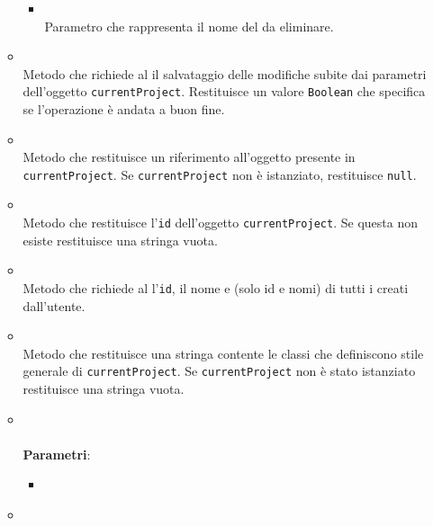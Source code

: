 \begin{itemize}
\begin{itemize}
\begin{itemize}
\item {}
\\ Parametro che rappresenta il nome del  da eliminare.
\end{itemize}
\item {}
\\ Metodo che richiede al  il salvataggio delle modifiche subite dai parametri dell'oggetto \texttt{currentProject}. Restituisce un valore \texttt{Boolean} che specifica se l'operazione è andata a buon fine. \dpReturnPromiseNoValue
\item {}
\\ Metodo che restituisce un riferimento all'oggetto presente in \texttt{currentProject}. Se \texttt{currentProject} non è istanziato, restituisce \texttt{null}.
\item {}
\\ Metodo che restituisce l'\texttt{id} dell'oggetto \texttt{currentProject}. Se questa non esiste restituisce una stringa vuota.
\item {}
\\ Metodo che richiede al  l'\texttt{id}, il nome e  (solo id e nomi) di tutti i  creati dall'utente.
\item {}
\\ Metodo che restituisce una stringa contente le classi  che definiscono stile generale di \texttt{currentProject}. Se \texttt{currentProject} non è stato istanziato restituisce una stringa vuota.
\item {}
\\ \dpHandleError
\\ \textbf{Parametri}:
\begin{itemize}
\item {}
\\ \dpResponseParam
\end{itemize}
\item {}
\\ \dpHandleSuccess

\end{itemize}
\end{itemize}
